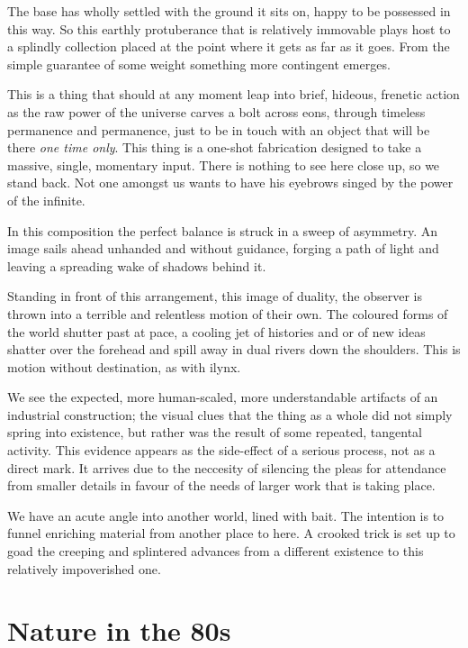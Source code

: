 \documentclass{book}
\begin{document}
The base has wholly settled with the ground it sits on, happy to be possessed
in this way. So this earthly protuberance that is relatively immovable plays
host to a splindly collection placed at the point where it gets as far as it
goes. From the simple guarantee of some weight something more contingent
emerges.

This is a thing that should at any moment leap into brief, hideous, frenetic
action as the raw power of the universe carves a bolt across eons, through
timeless permanence and permanence, just to be in touch with an object that
will be there \emph{one time only}.  This thing is a one-shot fabrication
designed to take a massive, single, momentary input. There is nothing to see
here close up, so we stand back. Not one amongst us wants to have his eyebrows
singed by the power of the infinite.

In this composition the perfect balance is struck in a sweep of asymmetry. An
image sails ahead unhanded and without guidance, forging a path of light and
leaving a spreading wake of shadows behind it.

Standing in front of this arrangement, this image of duality, the observer is
thrown into a terrible and relentless motion of their own. The coloured forms
of the world shutter past at pace, a cooling jet of histories and or of new
ideas shatter over the forehead and spill away in dual rivers down the
shoulders. This is motion without destination, as with ilynx.

We see the expected, more human-scaled, more understandable artifacts of an
industrial construction; the visual clues that the thing as a whole did not
simply spring into existence, but rather was the result of some repeated,
tangental activity. This evidence appears as the side-effect of a serious
process, not as a direct mark. It arrives due to the neccesity of silencing the
pleas for attendance from smaller details in favour of the needs of larger work
that is taking place.

We have an acute angle into another world, lined with bait. The intention is to
funnel enriching material from another place to here. A crooked trick is set up
to goad the creeping and splintered advances from a different existence to this
relatively impoverished one. 

\chapter{Nature in the 80s}
\end{document}
